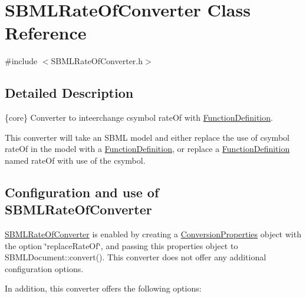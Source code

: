 \hypertarget{class_s_b_m_l_rate_of_converter}{}\section{S\+B\+M\+L\+Rate\+Of\+Converter Class Reference}
\label{class_s_b_m_l_rate_of_converter}


{\ttfamily \#include $<$S\+B\+M\+L\+Rate\+Of\+Converter.\+h$>$}



\subsection{Detailed Description}
\{core\} Converter to inteerchange csymbol \textquotesingle{}rate\+Of\textquotesingle{} with \hyperlink{class_function_definition}{Function\+Definition}.



This converter will take an S\+B\+ML model and either replace the use of csymbol rate\+Of in the model with a \hyperlink{class_function_definition}{Function\+Definition}, or replace a \hyperlink{class_function_definition}{Function\+Definition} named \textquotesingle{}rate\+Of\textquotesingle{} with use of the csymbol.\hypertarget{class_s_b_m_l_rate_of_converter_SBMLRateOfConverter-usage}{}\subsection{Configuration and use of S\+B\+M\+L\+Rate\+Of\+Converter}\label{class_s_b_m_l_rate_of_converter_SBMLRateOfConverter-usage}
\hyperlink{class_s_b_m_l_rate_of_converter}{S\+B\+M\+L\+Rate\+Of\+Converter} is enabled by creating a \hyperlink{class_conversion_properties}{Conversion\+Properties} object with the option {\ttfamily \char`\"{}replace\+Rate\+Of\char`\"{}}, and passing this properties object to S\+B\+M\+L\+Document\+::convert(). This converter does not offer any additional configuration options.

In addition, this converter offers the following options\+:

